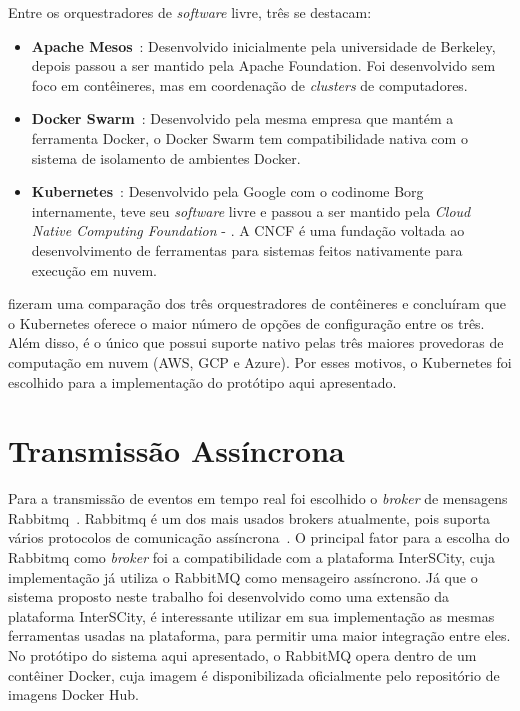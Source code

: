 Entre os orquestradores de \textit{software} livre, três se destacam:

\begin{itemize}
    \item \textbf{Apache Mesos}~\citep{Mesos}: Desenvolvido inicialmente pela universidade de Berkeley, depois passou a ser mantido pela Apache Foundation. Foi desenvolvido sem foco em contêineres, mas em coordenação de \textit{clusters} de computadores.
    \item \textbf{Docker Swarm}~\cite{Swarm}: Desenvolvido pela mesma empresa que mantém a ferramenta Docker, o Docker Swarm tem compatibilidade nativa com o sistema de isolamento de ambientes Docker.
    \item \textbf{Kubernetes}~\citep{Kubernetes}: Desenvolvido pela Google com o codinome Borg internamente, teve seu \textit{software} livre e passou a ser mantido pela \textit{Cloud Native Computing Foundation} - \cite{cnfc}. A CNCF é uma fundação voltada ao desenvolvimento de ferramentas para sistemas feitos nativamente para execução em nuvem.
\end{itemize}  
    
\cite{Truyen_2019} fizeram uma comparação dos três orquestradores de contêineres e concluíram que o Kubernetes oferece o maior número de opções de configuração entre os três. Além disso, é o único que possui suporte nativo pelas três maiores provedoras de computação em nuvem (AWS, GCP e Azure). Por esses motivos, o Kubernetes foi escolhido para a implementação do protótipo aqui apresentado.


\section{Transmissão Assíncrona}

Para a transmissão de eventos em tempo real foi escolhido o \textit{broker} de mensagens Rabbitmq~\citep{RabbitMq}. Rabbitmq é um dos mais usados brokers atualmente, pois suporta vários protocolos de comunicação assíncrona~\citep{Dobbelaere:2017:KVR:3093742.3093908}. O principal fator para a escolha do Rabbitmq como \textit{broker} foi a compatibilidade com a plataforma InterSCity, cuja implementação já utiliza o RabbitMQ como mensageiro assíncrono. Já que o sistema proposto neste trabalho foi desenvolvido como uma extensão da plataforma InterSCity, é interessante utilizar em sua implementação as mesmas ferramentas usadas na plataforma, para permitir uma maior integração entre eles.
No protótipo do sistema aqui apresentado, o RabbitMQ opera dentro de um contêiner Docker, cuja imagem é disponibilizada oficialmente pelo repositório de imagens Docker Hub. 



